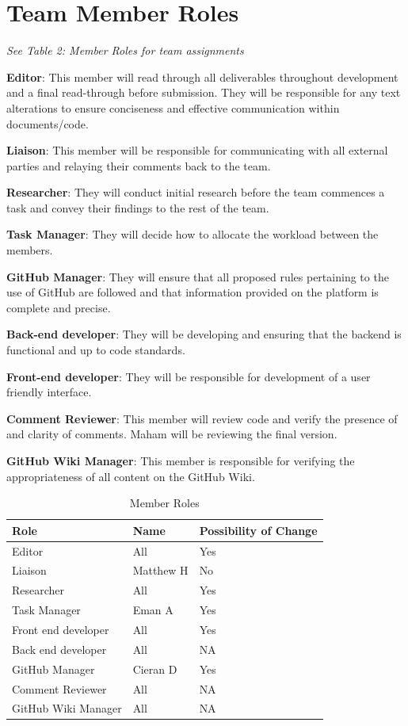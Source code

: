\documentclass{article}
\begin{document}
\section{Team Member Roles}

\textit{See Table 2: Member Roles for team assignments} \\
\begin{flushleft}
  \textbf{Editor}: This member will read through all deliverables throughout development and a final read-through before submission. They will be responsible for any
  text alterations to ensure conciseness and effective communication within documents/code.
 
  \textbf{Liaison}: This member will be responsible for communicating with all external parties and relaying their comments back to the team.

  \textbf{Researcher}: They will conduct initial research before the team commences a task and convey their findings to the rest of the team.

  \textbf{Task Manager}: They will decide how to allocate the workload between the members.

  \textbf{GitHub Manager}: They will ensure that all proposed rules pertaining to the use of GitHub are followed and that information provided on the platform is complete and precise.

  \textbf{Back-end developer}: They will be developing and ensuring that the backend is functional and up to code standards.

  \textbf{Front-end developer}: They will be responsible for development of a user friendly interface.

  \textbf{Comment Reviewer}: This member will review code and verify the presence of and clarity of comments. Maham will be reviewing the final version.

  \textbf{GitHub Wiki Manager}: This member is responsible for verifying the appropriateness of all content on the GitHub Wiki.
\end{flushleft}

\begin{table}[H]
\caption{Member Roles} \label{Proposed Assignments}
\begin{tabularx}{\textwidth}{llX}
\toprule
\textbf{Role} & \textbf{Name} & \textbf{Possibility of Change}\\
\midrule
Editor & All & Yes\\
Liaison & Matthew H  & No\\
Researcher & All & Yes \\
Task Manager & Eman A & Yes \\
Front end developer & All & Yes \\
Back end developer & All & NA \\
GitHub Manager & Cieran D & Yes \\
Comment Reviewer & All & NA \\
GitHub Wiki Manager & All & NA \\
\bottomrule
\end{tabularx}
\end{table}
\end{document}
